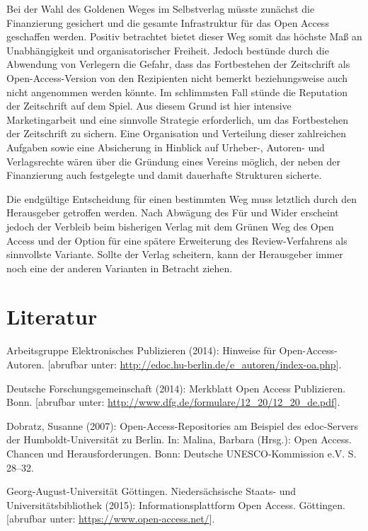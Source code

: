 \documentclass[a4paper,
fontsize=11pt,
oneside,
numbers=noperiodatend,
parskip=half-,
bibliography=totoc,
final
]{scrartcl}
\begin{document}
Bei der Wahl des Goldenen Weges im Selbstverlag müsste zunächst die
Finanzierung gesichert und die gesamte Infrastruktur für das Open Access
geschaffen werden. Positiv betrachtet bietet dieser Weg somit das
höchste Maß an Unabhängigkeit und organisatorischer Freiheit. Jedoch
bestünde durch die Abwendung von Verlegern die Gefahr, dass das
Fortbestehen der Zeitschrift als Open-Access-Version von den Rezipienten
nicht bemerkt beziehungsweise auch nicht angenommen werden könnte. Im
schlimmsten Fall stünde die Reputation der Zeitschrift auf dem Spiel.
Aus diesem Grund ist hier intensive Marketingarbeit und eine sinnvolle
Strategie erforderlich, um das Fortbestehen der Zeitschrift zu sichern.
Eine Organisation und Verteilung dieser zahlreichen Aufgaben sowie eine
Absicherung in Hinblick auf Urheber-, Autoren- und Verlagsrechte wären
über die Gründung eines Vereins möglich, der neben der Finanzierung auch
festgelegte und damit dauerhafte Strukturen sicherte.

Die endgültige Entscheidung für einen bestimmten Weg muss letztlich
durch den Herausgeber getroffen werden. Nach Abwägung des Für und Wider
erscheint jedoch der Verbleib beim bisherigen Verlag mit dem Grünen Weg
des Open Access und der Option für eine spätere Erweiterung des
Review-Verfahrens als sinnvollste Variante. Sollte der Verlag scheitern,
kann der Herausgeber immer noch eine der anderen Varianten in Betracht
ziehen.

\section*{Literatur}\label{literatur}

Arbeitsgruppe Elektronisches Publizieren (2014): Hinweise für
Open-Access-Autoren. {[}abrufbar unter:
\url{http://edoc.hu-berlin.de/e_autoren/index-oa.php}{]}.

Deutsche Forschungsgemeinschaft (2014): Merkblatt Open Access
Publizieren. Bonn. {[}abrufbar unter:
\url{http://www.dfg.de/formulare/12_20/12_20_de.pdf}{]}.

Dobratz, Susanne (2007): Open-Access-Repositories am Beispiel des
edoc-Servers der Humboldt-Universität zu Berlin. In: Malina, Barbara
(Hrsg.): Open Access. Chancen und Herausforderungen. Bonn: Deutsche
UNESCO-Kommission e.V. S. 28--32.

Georg-August-Universität Göttingen. Niedersächsische Staats- und
Universitätsbibliothek (2015): Informationsplattform Open Access.
Göttingen.\\
{[}abrufbar unter: \url{https://www.open-access.net/}{]}.
\end{document}
